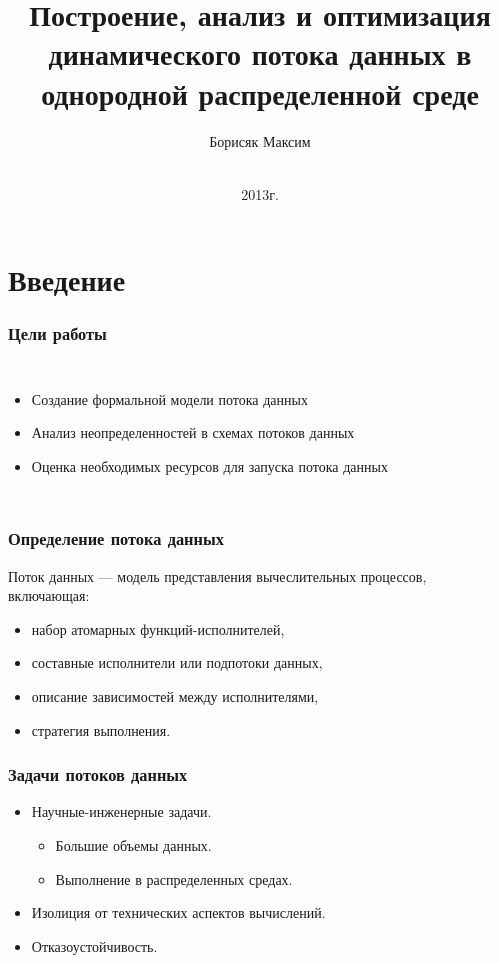 \documentclass[10pt,pdf,hyperref={unicode}]{beamer}
\title{Построение, анализ и оптимизация динамического потока данных в однородной распределенной среде}
\author{Борисяк Максим}
\institute{МФТИ (ГУ)
}
\date{
    \\
    2013г.
}
\begin{document}
\begin{frame}
  \maketitle
\end{frame}

\section{Введение}

\begin{frame}
  \frametitle{Цели работы}
 \begin{columns}
    \column{\textwidth}
     \begin{itemize}
        \item Создание формальной модели потока данных
        \item Анализ неопределенностей в схемах потоков данных
        \item Оценка необходимых ресурсов для запуска потока данных
    \end{itemize}
\end{columns}
\end{frame}

\begin{frame}
  \frametitle{Определение потока данных}
  Поток данных --- модель представления вычеслительных процессов, включающая:
  \begin{itemize}
    \item набор атомарных функций-исполнителей,
    \item составные исполнители или подпотоки данных,
    \item описание зависимостей между исполнителями,
    \item стратегия выполнения.
  \end{itemize}
\end{frame}

\begin{frame}
  \frametitle{Задачи потоков данных}
  \begin{itemize}
    \item Научные-инженерные задачи.
    \begin{itemize}
      \item Большие объемы данных.
      \item Выполнение в распределенных средах.
    \end{itemize}
    \item Изолиция от технических аспектов вычислений.
    \item Отказоустойчивость.
  \end{itemize}
\end{frame}
\end{document}
